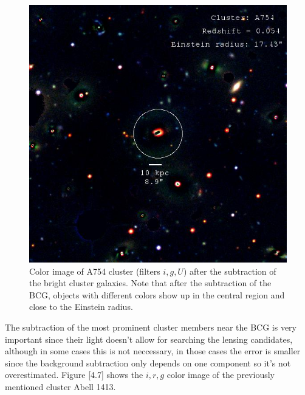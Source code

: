 \begin{figure}[H]
\centering
\includegraphics[width=12cm]{images/cA754_galfit.jpg}
\caption[Color image of A754 after fitting the bright objects]{Color image of A754 cluster (filters $i,g,U$) after the subtraction of the bright cluster galaxies. Note that after the subtraction of the BCG, objects with different colors show up in the central region and close to the Einstein radius.}
\end{figure}

The subtraction of the most prominent cluster members near the BCG is very important since their light doesn't allow for searching the lensing candidates, although in some cases this is not neccessary, in those cases the error is smaller since the background subtraction only depends on one component so it's not overestimated. Figure [4.7] shows the $i,r,g$ color image of the previously mentioned cluster Abell 1413. 

